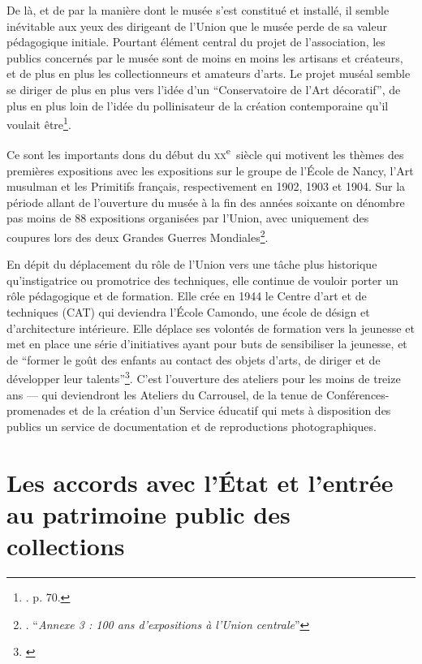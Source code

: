 \vspace{1em}



 

De là, et de par la manière dont le musée s'est constitué et installé, il semble inévitable aux yeux des dirigeant de l'Union que le musée perde de sa valeur pédagogique initiale. Pourtant élément central du projet de l'association, les publics concernés par le musée sont de moins en moins les artisans et créateurs, et de plus en plus les collectionneurs et amateurs d'arts. Le projet muséal semble se diriger de plus en plus vers l'idée d'un \enquote{Conservatoire de l'Art décoratif}, de plus en plus loin de l'idée du pollinisateur de la création contemporaine qu'il voulait être\footnote{\cite{brunhammer_beau_1992}. p. 70.}. 

Ce sont les importants dons du début du \textsc{xx}\textsuperscript{e}~siècle qui motivent les thèmes des premières expositions avec les expositions sur le groupe de l'École de Nancy, l'Art musulman et les Primitifs français, respectivement en 1902, 1903 et 1904. Sur la période allant de l'ouverture du musée à la fin des années soixante on dénombre pas moins de 88 expositions organisées par l'Union, avec uniquement des coupures lors des deux Grandes Guerres Mondiales\footnote{\cite{noauthor__1970}. \enquote{\textit{Annexe 3 : 100 ans d'expositions à l'Union centrale}}}.

En dépit du déplacement du rôle de l'Union vers une tâche plus historique qu'instigatrice ou promotrice des techniques, elle continue de vouloir porter un rôle pédagogique et de formation. Elle crée en 1944 le Centre d'art et de techniques (CAT) qui deviendra l'École Camondo, une école de désign et d'architecture intérieure. Elle déplace ses volontés de formation vers la jeunesse et met en place une série d'initiatives ayant pour buts de sensibiliser la jeunesse, et de \enquote{former le goût des enfants au contact des objets d'arts, de diriger et de développer leur talents}\footnote{\cite{noauthor__1970}}. C'est l'ouverture des ateliers pour les moins de treize ans — qui deviendront les Ateliers du Carrousel, de la tenue de Conférences-promenades et de la création d'un Service éducatif qui mets à disposition des publics un service de documentation et de reproductions photographiques. 

\section{Les accords avec l'État et l'entrée au patrimoine public des collections}

